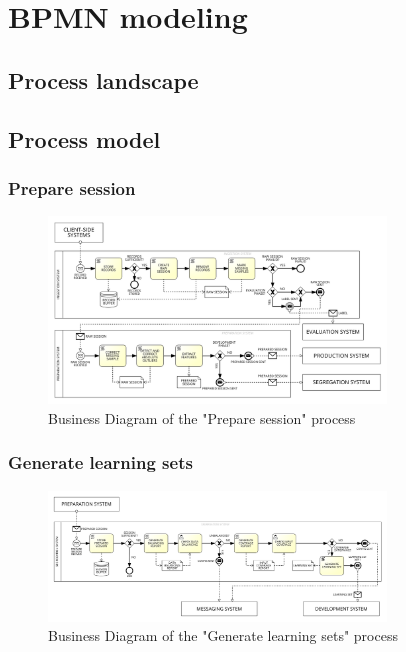 \section{BPMN modeling}
\label{sec:bpmn_modeling}

\subsection{Process landscape}

\subsection{Process model}

\subsubsection{Prepare session}
\label{sec:prepare_session}

\begin{figure}[H]
\centering
\includegraphics[width=0.8\textwidth]{figures/Business Diagram - Prepare Session.png}
\caption{Business Diagram of the "Prepare session" process}
\label{fig:prepare_session}
\end{figure}

\subsubsection{Generate learning sets}
\label{sec:generate_learning_sets}

\begin{figure}[H]
\centering
\includegraphics[width=0.8\textwidth]{figures/Business Diagram - Generate Learning Sets.png}
\caption{Business Diagram of the "Generate learning sets" process}
\label{fig:generate_learning_sets}
\end{figure}

